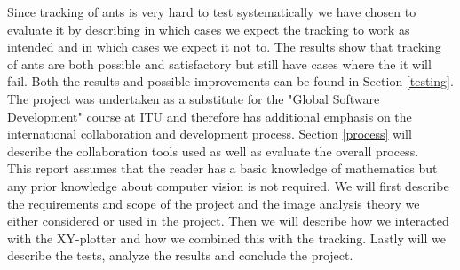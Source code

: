 Since tracking of ants is very hard to test systematically we have chosen to evaluate it by describing in which cases we expect the tracking to work as intended and in which cases we expect it not to. The results show that tracking of ants are both possible and satisfactory but still have cases where the it will fail. Both the results and possible improvements can be found in Section \ref{testing}.\\

The project was undertaken as a substitute for the "Global Software Development" course at ITU and therefore has additional emphasis on the international collaboration and development process. Section \ref{process} will describe the collaboration tools used as well as evaluate the overall process. \\ 

This report assumes that the reader has a basic knowledge of mathematics but any prior knowledge about computer vision is not required. We will first describe the requirements and scope of the project and the image analysis theory we either considered or used in the project. Then we will describe how we interacted with the XY-plotter and how we combined this with the tracking. Lastly will we describe the tests, analyze the results and conclude the project.



